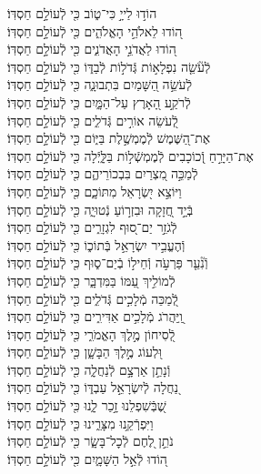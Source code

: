 \documentclass[twoside, openany, parskip=half, 11pt]{book}
\begin{document}
\begin{narrow}
הוֹד֣וּ לַייָ֣ כִּי־ט֑וֹב \hfill
 כִּ֖י לְֿעוֹלָ֣ם חַסְדּֽוֹ׃ \\
 ה֭וֹדוּ לֵאלֹהֵ֣י הָאֱלֹהִ֑ים \hfill כִּ֖י לְֿעוֹלָ֣ם חַסְדּֽוֹ׃ \\
 ה֭וֹדוּ לַאֲדֹנֵ֣י הָאֲדֹנִ֑ים \hfill כִּ֖י לְֿעוֹלָ֣ם חַסְדּֽוֹ׃ \\
 לְֿעֹ֘שֵׂ֤ה נִפְלָא֣וֹת גְּֿדֹל֣וֹת לְֿבַדּ֑וֹ \hfill כִּ֖י לְֿעוֹלָ֣ם חַסְדּֽוֹ׃ \\
 לְֿעֹשֵׂ֣ה הַ֭שָּׁמַיִם בִּתְבוּנָ֑ה \hfill כִּ֖י לְֿעוֹלָ֣ם חַסְדּֽוֹ׃ \\
 לְֿרֹקַ֣ע הָ֭אָרֶץ עַל־הַמָּ֑יִם \hfill כִּ֖י לְֿעוֹלָ֣ם חַסְדּֽוֹ׃ \\
 לְֿ֭עֹשֵׂה אוֹרִ֣ים גְּֿדֹלִ֑ים \hfill כִּ֖י לְֿעוֹלָ֣ם חַסְדּֽוֹ׃ \\
 אֶת־הַ֭שֶּׁמֶשׁ לְֿמֶמְשֶׁ֣לֶת בַּיּ֑וֹם \hfill כִּ֖י לְֿעוֹלָ֣ם חַסְדּֽוֹ׃ \\
 אֶת־הַיָּרֵ֣חַ וְֿ֭כוֹכָבִים לְֿמֶמְשְֿׁל֣וֹת בַּלָּ֑יְֿלָה \hfill כִּ֖י לְֿעוֹלָ֣ם חַסְדּֽוֹ׃ \\
 לְֿמַכֵּ֣ה מִ֭צְרַיִם בִּבְכוֹרֵיהֶ֑ם \hfill כִּ֖י לְֿעוֹלָ֣ם חַסְדּֽוֹ׃ \\
 וַיּוֹצֵ֣א יִ֭שְׂרָאֵל מִתּוֹכָ֑ם \hfill כִּ֖י לְֿעוֹלָ֣ם חַסְדּֽוֹ׃ \\
 בְּֿיָ֣ד חֲ֭זָקָה וּבִזְר֣וֹעַ נְֿטוּיָ֑ה \hfill כִּ֖י לְֿעוֹלָ֣ם חַסְדּֽוֹ׃ \\
 לְֿגֹזֵ֣ר יַם־ס֭וּף לִגְזָרִ֑ים \hfill כִּ֖י לְֿעוֹלָ֣ם חַסְדּֽוֹ׃ \\
 וְֿהֶעֱבִ֣יר יִשְׂרָאֵ֣ל בְּֿתוֹכ֑וֹ \hfill כִּ֖י לְֿעוֹלָ֣ם חַסְדּֽוֹ׃ \\
 וְֿנִ֘עֵ֤ר פַּרְעֹ֣ה וְֿחֵיל֣וֹ בְֿיַם־ס֑וּף \hfill כִּ֖י לְֿעוֹלָ֣ם חַסְדּֽוֹ׃ \\
 לְֿמוֹלִ֣יךְ עַ֭מּוֹ בַּמִּדְבָּ֑ר \hfill כִּ֖י לְֿעוֹלָ֣ם חַסְדּֽוֹ׃ \\
 לְֿ֭מַכֵּה מְֿלָכִ֣ים גְּֿדֹלִ֑ים \hfill כִּ֖י לְֿעוֹלָ֣ם חַסְדּֽוֹ׃ \\
 וַֽ֭יַּהֲרֹג מְֿלָכִ֣ים אַדִּירִ֑ים \hfill כִּ֖י לְֿעוֹלָ֣ם חַסְדּֽוֹ׃ \\
 לְֿ֭סִיחוֹן מֶ֣לֶךְ הָאֱמֹרִ֑י \hfill כִּ֖י לְֿעוֹלָ֣ם חַסְדּֽוֹ׃ \\
 וּ֭לְעוֹג מֶ֣לֶךְ הַבָּשָׁ֑ן \hfill כִּ֖י לְֿעוֹלָ֣ם חַסְדּֽוֹ׃ \\
 וְֿנָתַ֣ן אַרְצָ֣ם לְֿנַחֲלָ֑ה \hfill כִּ֖י לְֿעוֹלָ֣ם חַסְדּֽוֹ׃ \\
 נַ֭חֲלָה לְֿיִשְׂרָאֵ֣ל עַבְדּ֑וֹ \hfill כִּ֖י לְֿעוֹלָ֣ם חַסְדּֽוֹ׃ \\
 שֶׁ֭בְּֿשִׁפְלֵנוּ זָ֣כַר לָ֑נוּ \hfill כִּ֖י לְֿעוֹלָ֣ם חַסְדּֽוֹ׃ \\
 וַיִּפְרְֿקֵ֥נוּ מִצָּרֵ֑ינוּ \hfill כִּ֖י לְֿעוֹלָ֣ם חַסְדּֽוֹ׃ \\
 נֹתֵ֣ן לֶ֭חֶם לְֿכׇל־בָּשָׂ֑ר \hfill כִּ֖י לְֿעוֹלָ֣ם חַסְדּֽוֹ׃ \\
 ה֭וֹדוּ לְֿאֵ֣ל הַשָּׁמָ֑יִם \hfill כִּ֖י לְֿעוֹלָ֣ם חַסְדּֽוֹ׃ \\




\end{narrow}
\end{document}
